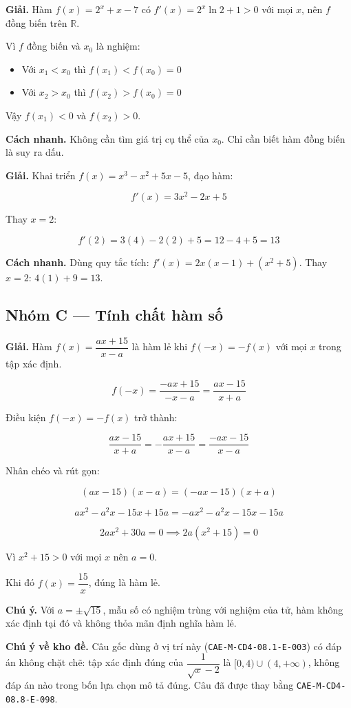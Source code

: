 \documentclass[11pt, a4paper]{article}
\begin{document}
\begin{dapan}[18 — Đáp án B]
\textbf{Giải.} Hàm $f(x) = 2^x + x - 7$ có $f'(x) = 2^x\ln 2 + 1 > 0$ với mọi $x$, nên $f$ đồng biến trên $\mathbb{R}$.

Vì $f$ đồng biến và $x_0$ là nghiệm:
\begin{itemize}[leftmargin=1.4em, itemsep=2pt]
\item Với $x_1 < x_0$ thì $f(x_1) < f(x_0) = 0$
\item Với $x_2 > x_0$ thì $f(x_2) > f(x_0) = 0$
\end{itemize}


Vậy $f(x_1) < 0$ và $f(x_2) > 0$.

\textbf{Cách nhanh.} Không cần tìm giá trị cụ thể của $x_0$. Chỉ cần biết hàm đồng biến là suy ra dấu.
\end{dapan}

\begin{dapan}[19 — Đáp án C]
\textbf{Giải.} Khai triển $f(x) = x^3 - x^2 + 5x - 5$, đạo hàm:

$$f'(x) = 3x^2 - 2x + 5$$

Thay $x = 2$:

$$f'(2) = 3(4) - 2(2) + 5 = 12 - 4 + 5 = 13$$

\textbf{Cách nhanh.} Dùng quy tắc tích: $f'(x) = 2x(x-1) + (x^2+5)$. Thay $x=2$: $4(1) + 9 = 13$.
\end{dapan}

\subsection*{Nhóm C — Tính chất hàm số}

\begin{dapan}[20 — Đáp án A]
\textbf{Giải.} Hàm $f(x) = \dfrac{ax+15}{x-a}$ là hàm lẻ khi $f(-x) = -f(x)$ với mọi $x$ trong tập xác định.

$$f(-x) = \frac{-ax+15}{-x-a} = \frac{ax-15}{x+a}$$

Điều kiện $f(-x) = -f(x)$ trở thành:

$$\frac{ax-15}{x+a} = -\frac{ax+15}{x-a} = \frac{-ax-15}{x-a}$$

Nhân chéo và rút gọn:

$$(ax-15)(x-a) = (-ax-15)(x+a)$$

$$ax^2 - a^2x - 15x + 15a = -ax^2 - a^2x - 15x - 15a$$

$$2ax^2 + 30a = 0 \implies 2a(x^2+15) = 0$$

Vì $x^2 + 15 > 0$ với mọi $x$ nên $a = 0$.

Khi đó $f(x) = \dfrac{15}{x}$, đúng là hàm lẻ.

\textbf{Chú ý.} Với $a = \pm\sqrt{15}$, mẫu số có nghiệm trùng với nghiệm của tử, hàm không xác định tại đó và không thỏa mãn định nghĩa hàm lẻ.

\textbf{Chú ý về kho đề.} Câu gốc dùng ở vị trí này (\texttt{CAE-M-CD4-08.1-E-003}) có đáp án không chặt chẽ: tập xác định đúng của $\dfrac{1}{\sqrt{x}-2}$ là $[0,4) \cup (4,+\infty)$, không đáp án nào trong bốn lựa chọn mô tả đúng. Câu đã được thay bằng \texttt{CAE-M-CD4-08.8-E-098}.
\end{dapan}
\end{document}
